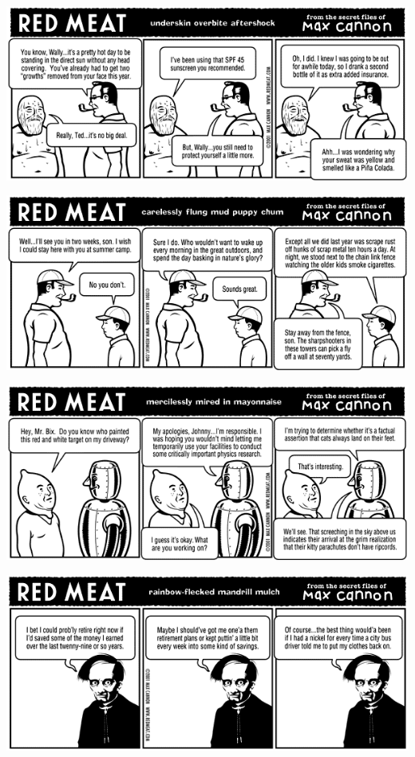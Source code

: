 \documentclass[a4paper,twoside,11pt]{article}
\begin{document}
\includegraphics[width=\textwidth]{redmeat_2001-06-12.png}



\includegraphics[width=\textwidth]{redmeat_2001-06-19.png}



\includegraphics[width=\textwidth]{redmeat_2001-06-26.png}



\includegraphics[width=\textwidth]{redmeat_2001-07-03.png}
\end{document}

